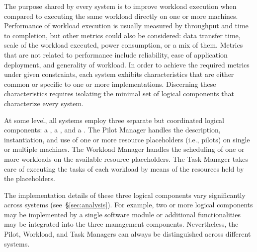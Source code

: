 \documentclass{sig-alternate}
\begin{document}
The purpose shared by every \pilotjob system is to improve workload execution
when compared to executing the same workload directly on one or more machines.
Performance of workload execution is usually measured by throughput and time to
completion, but other metrics could also be considered: data transfer time,
scale of the workload executed, power consumption, or a mix of them. Metrics
that are not related to performance include reliability, ease of application
deployment, and generality of workload. In order to achieve the required metrics
under given constraints, each \pilotjob system exhibits characteristics that are
either common or specific to one or more implementations. Discerning these
characteristics requires isolating the minimal set of logical components that
characterize every \pilotjob system.

At some level, all \pilotjob systems employ three separate but coordinated
logical components: a , a , and a
. The Pilot Manager handles the description, instantiation,
and use of one or more resource placeholders (i.e., pilots) on single or
multiple machines. The Workload Manager handles the scheduling of one or more
workloads on the available resource placeholders. The Task Manager takes care of
executing the tasks of each workload by means of the resources held by the
placeholders.

The implementation details of these three logical components vary significantly
across \pilotjob systems (see~\S\ref{sec:analysis}). For example, two or more
logical components may be implemented by a single software module or additional
functionalities may be integrated into the three management components.
Nevertheless, the Pilot, Workload, and Task Managers can always be
distinguished across different \pilotjob systems.


\end{document}

